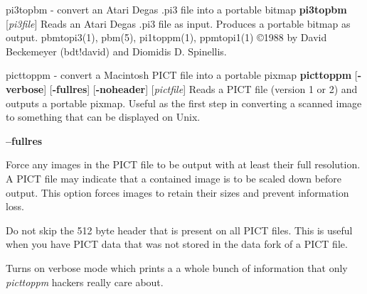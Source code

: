 \newpage
%

pi3topbm - convert an Atari Degas .pi3 file into a portable bitmap
{\bf pi3topbm}
{\rm [}{\it pi3file}{\rm ]}
Reads an Atari Degas .pi3 file as input.
Produces a portable bitmap as output.
pbmtopi3(1), pbm(5), pi1toppm(1), ppmtopi1(1)
\copyright 1988 by David Beckemeyer (bdt!david) and Diomidis D. Spinellis.
%
 
%

\newpage
%

picttoppm - convert a Macintosh PICT file into a portable pixmap
{\bf picttoppm}
{\rm [}{\bf -verbose}{\rm ]}
{\rm [}{\bf -fullres}{\rm ]}
{\rm [}{\bf -noheader}{\rm ]}
{\rm [}{\it pictfile}{\rm ]}
Reads a PICT file (version 1 or 2) and outputs a portable pixmap.
Useful as the first step in converting a scanned image to something
that can be displayed on Unix.
\begin{TPlist}{{\bf --fullres}}
\item[{{\bf --fullres}}]
Force any images in the PICT file to be output with at least their
full resolution.  A PICT file may indicate that a contained
image is to be scaled down before output.  This option forces images
to retain their sizes and prevent information loss.
\item[{{\bf --noheader}}]
Do not skip the 512 byte header that is present on all PICT files.
This is useful when you have PICT data that was not stored in
the data fork of a PICT file.
\item[{{\bf --verbose}}]
Turns on verbose mode which prints a 
a whole bunch of information that only
{\it picttoppm}
hackers really care about.
\end{TPlist}


